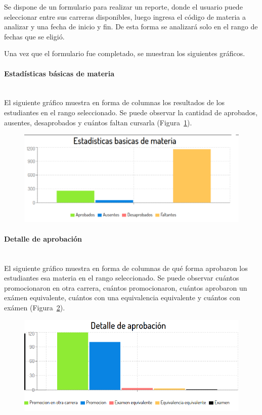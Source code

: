 Se dispone de un formulario para realizar un reporte, donde el usuario puede seleccionar entre sus carreras disponibles, luego ingresa el código de materia a analizar y una fecha de inicio y fin. De esta forma se analizará solo en el rango de fechas que se eligió.

Una vez que el formulario fue completado, se muestran los siguientes gráficos.

\paragraph{Estadísticas básicas de materia} \mbox{}\\
El siguiente gráfico muestra en forma de columnas los resultados de los estudiantes en el rango seleccionado. Se puede observar la cantidad de aprobados, ausentes, desaprobados y cuántos faltan cursarla  (Figura~\ref{fig:sa-datos-basico}).

\begin{figure}[H]
  \centering
    \includegraphics[scale=0.4]{images/seguimiento-academico/sa-datosbasicos.png}
  \label{fig:sa-datos-basico}
\end{figure}

\paragraph{Detalle de aprobación} \mbox{}\\
El siguiente gráfico muestra en forma de columnas de qué forma aprobaron los estudiantes esa materia en el rango seleccionado. Se puede observar cuántos promocionaron en otra carrera, cuántos promocionaron, cuántos aprobaron un exámen equivalente, cuántos con una equivalencia equivalente y cuántos con exámen  (Figura~\ref{fig:sa-detalle-aprobacion}).

\begin{figure}[H]
  \centering
    \includegraphics[scale=0.4]{images/seguimiento-academico/sa-detalleaprobacion.png}
  \label{fig:sa-detalle-aprobacion}
\end{figure}

